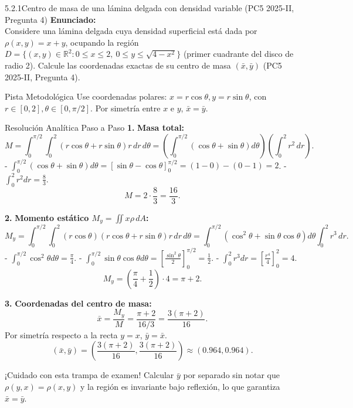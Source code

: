 \documentclass[11pt,a4paper]{article}
\begin{document}
\begin{nivelbox}{5.2.1}{Centro de masa de una lámina delgada con densidad variable (PC5 2025-II, Pregunta 4)}
\textbf{Enunciado:}\\
Considere una lámina delgada cuya densidad superficial está dada por $\rho(x,y) = x + y$, ocupando la región $D = \{ (x,y) \in \mathbb{R}^2 : 0 \le x \le 2, \ 0 \le y \le \sqrt{4 - x^2} \}$ (primer cuadrante del disco de radio 2). Calcule las coordenadas exactas de su centro de masa $(\bar{x}, \bar{y})$ (PC5 2025-II, Pregunta 4).

\begin{observacionbox}{Pista Metodológica}
Use coordenadas polares: $x = r\cos\theta, y = r\sin\theta$, con $r \in [0, 2], \theta \in [0, \pi/2]$. Por simetría entre $x$ e $y$, $\bar{x} = \bar{y}$.
\end{observacionbox}

\begin{ejerciciobox}{Resolución Analítica Paso a Paso}
\smallskip\noindent\textbf{1.} \textbf{Masa total:}
\[M = \int_0^{\pi/2} \int_0^2 (r\cos\theta + r\sin\theta) r \, dr \, d\theta = \left( \int_0^{\pi/2} (\cos\theta + \sin\theta) d\theta \right) \left( \int_0^2 r^2 \, dr \right).\]
- $\int_0^{\pi/2} (\cos\theta + \sin\theta) d\theta = [\sin\theta - \cos\theta]_0^{\pi/2} = (1 - 0) - (0 - 1) = 2$.
- $\int_0^2 r^2 dr = \frac{8}{3}$.
\[M = 2 \cdot \frac{8}{3} = \frac{16}{3}.\]

\smallskip\noindent\textbf{2.} \textbf{Momento estático $M_y = \iint x \rho \, dA$:}
\[M_y = \int_0^{\pi/2} \int_0^2 (r\cos\theta)(r\cos\theta + r\sin\theta) r \, dr \, d\theta = \int_0^{\pi/2} (\cos^2\theta + \sin\theta\cos\theta) d\theta \int_0^2 r^3 \, dr.\]
- $\int_0^{\pi/2} \cos^2\theta d\theta = \frac{\pi}{4}$.
- $\int_0^{\pi/2} \sin\theta\cos\theta d\theta = \left[ \frac{\sin^2\theta}{2} \right]_0^{\pi/2} = \frac{1}{2}$.
- $\int_0^2 r^3 dr = \left[ \frac{r^4}{4} \right]_0^2 = 4$.
\[M_y = \left( \frac{\pi}{4} + \frac{1}{2} \right) \cdot 4 = \pi + 2.\]

\smallskip\noindent\textbf{3.} \textbf{Coordenadas del centro de masa:}
\[\bar{x} = \frac{M_y}{M} = \frac{\pi + 2}{16/3} = \frac{3(\pi + 2)}{16}.\]
Por simetría respecto a la recta $y = x$, $\bar{y} = \bar{x}$.
\[(\bar{x}, \bar{y}) = \left( \frac{3(\pi + 2)}{16}, \frac{3(\pi + 2)}{16} \right) \approx (0.964, 0.964).\]
\end{ejerciciobox}

\begin{errorbox}{¡Cuidado con esta trampa de examen!}
Calcular $\bar{y}$ por separado sin notar que $\rho(y,x) = \rho(x,y)$ y la región es invariante bajo reflexión, lo que garantiza $\bar{x} = \bar{y}$.
\end{errorbox}
\end{nivelbox}
\bigskip
\end{document}
